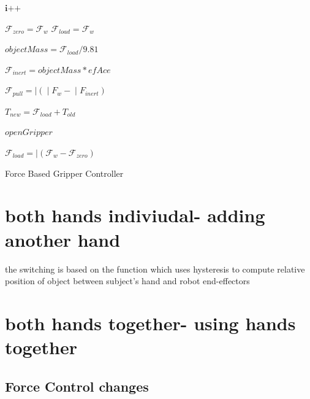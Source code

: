 \begin{algorithm}[H]
	\DontPrintSemicolon
	
	\textit{$\textbf{i++}$} 
	
	{
		{
			$\mathcal{F}_{zero}= \mathcal{F}_{w}$
		}
		{
			$\mathcal{F}_{load}= \mathcal{F}_{w}$
		}
		{
			$objectMass = \mathcal{F}_{load}/9.81 $
			
			$\mathcal{F}_{inert} = objectMass * efAce  $
			
			$\mathcal{F}_{pull} = \vert{(\mathcal\vert{{F}}_{w} - \mathcal\vert{{F}}_{inert})}$
			
			$T_{new} = \mathcal{F}_{load} + T_{old}$
			
			{
				$openGripper$
			}
		}
	}
	\Else
	{
		{
			$\mathcal{F}_{load} = \vert{(\mathcal{F}_{w} - \mathcal{F}_{zero})} $
		}
	}
	\caption{Force Based Gripper Controller}
\end{algorithm}


\newpage
\section{both hands indiviudal- adding another hand}

the switching is based on the function which  uses hysteresis to compute relative position of object between subject's hand and robot end-effectors 

\newpage
\section{both hands together- using hands together}

\subsection{Force Control changes}

